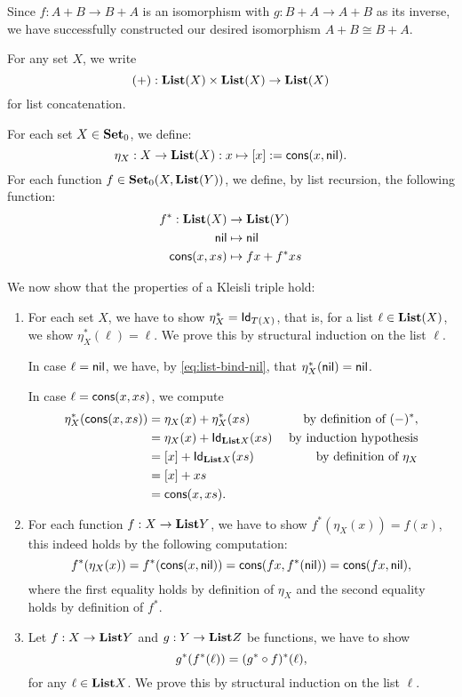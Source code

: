 \begin{solution}
\noindent
Since $f : A+B \to B+A$ is an isomorphism with $g : B+A \to A+B$ as its inverse, we have successfully constructed our desired isomorphism $A+B \cong B+A$.
\end{solution}


\begin{solution}
  \label{sol:kleisli_triple_list}
  For any set $X$, we write
  \[ (+) : \List(X) \times \List(X) \to \List(X)\]
  for list concatenation.

  For each set $X\in\Ob \SET$, we define:
  \[
    \eta_X : X \to \List(X) : x\mapsto [x] := \cons(x,\nil).
  \]
  For each function $f\in\CHom{\Ob \SET}{X}{\List(Y)}$, we define, by list recursion, the following function:
  \begin{align}
    f^{*} : \List(X) &\to \List(Y) 
    \\
    \nil & \mapsto \nil  \label{eq:list-bind-nil}
    \\
    \cons(x,xs) &\mapsto fx + f^*xs  \label{eq:list-bind-cons}
  \end{align}
  
We now show that the properties of a Kleisli triple hold:
\begin{enumerate}
\item For each set $X$, we have to show $\eta_X^{*} = \Id[T(X)]$,
  that is, for a list $\ell \in \List (X)$, we show $\eta_X^{*}(\ell) = \ell$.
  We prove this by structural induction on the list $\ell$.
  
  In case $\ell = \nil$, we have, by \cref{eq:list-bind-nil}, that $\eta_X^{*}(\nil) = \nil$.
  
  In case $\ell = \cons(x,xs)$, we compute
  \begin{align*}
    \eta_X^{*}(\cons(x,xs)) &= \eta_X(x) + \eta_X^{*}(xs) & \text{ by definition of } (-)^{*},
    \\
                            &= \eta_X(x) + \Id[\List{X}](xs)  & \text{ by induction hypothesis}
    \\
                            &= [x] + \Id[\List{X}](xs) & \text{ by definition of } \eta_X
    \\
                            &= [x] + xs
    \\
                            &= \cons(x,xs).
  \end{align*}
  
  

\item For each function $f:X\to \List Y$, we have to show $f^{*}(\eta_X(x)) = f(x)$, this indeed holds by the following computation:
\[
f^{*}(\eta_X(x)) = f^{*}(\cons(x,\nil)) = \cons(fx, f^{*}(\nil)) = \cons(fx, \nil),
\]
where the first equality holds by definition of $\eta_X$ and the second equality holds by definition of $f^{*}$.
\item Let $f:X\to \List Y$ and $g:Y\to \List Z$ be functions, we have to show 
\[
g^{*}(f^{*}(\ell)) = (\co{f}{g^{*}})^{*}(\ell),
\] 
for any $\ell \in \List X$.
 We prove this by structural induction on the list $\ell$.


\end{enumerate}
\end{solution}
